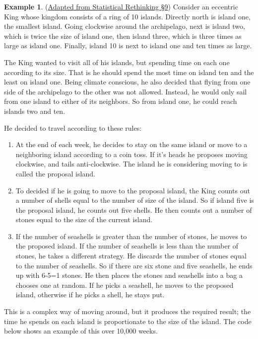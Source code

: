 \documentclass[
]{book}
\theoremstyle{definition}
\theoremstyle{definition}
\newtheorem{example}{Example}[chapter]
\theoremstyle{definition}
\theoremstyle{definition}
\theoremstyle{remark}
\begin{document}
\begin{example}
\protect\hypertarget{exm:King}{}\label{exm:King}(\href{https://xcelab.net/rm/statistical-rethinking/}{Adapted from Statistical Rethinking \S 9}) Consider an eccentric King whose kingdom consists of a ring of 10 islands. Directly north is island one, the smallest island. Going clockwise around the archipelago, next is island two, which is twice the size of island one, then island three, which is three times as large as island one. Finally, island 10 is next to island one and ten times as large.

The King wanted to visit all of his islands, but spending time on each one according to its size. That is he should spend the most time on island ten and the least on island one. Being climate conscious, he also decided that flying from one side of the archipelago to the other was not allowed. Instead, he would only sail from one island to either of its neighbors. So from island one, he could reach islands two and ten.

He decided to travel according to these rules:

\begin{enumerate}
\def\labelenumi{\arabic{enumi}.}
\item
  At the end of each week, he decides to stay on the same island or move to a neighboring island according to a coin toss. If it's heads he proposes moving clockwise, and tails anti-clockwise. The island he is considering moving to is called the proposal island.
\item
  To decided if he is going to move to the proposal island, the King counts out a number of shells equal to the number of size of the island. So if island five is the proposal island, he counts out five shells. He then counts out a number of stones equal to the size of the current island.
\item
  If the number of seashells is greater than the number of stones, he moves to the proposed island. If the number of seashells is less than the number of stones, he takes a different strategy. He discards the number of stones equal to the number of seashells. So if there are six stone and five seashells, he ends up with 6-5=1 stones. He then places the stones and seashells into a bag a chooses one at random. If he picks a seashell, he moves to the proposed island, otherwise if he picks a shell, he stays put.
\end{enumerate}

This is a complex way of moving around, but it produces the required result; the time he spends on each island is proportionate to the size of the island. The code below shows an example of this over 10,000 weeks.


\end{example}
\end{document}
